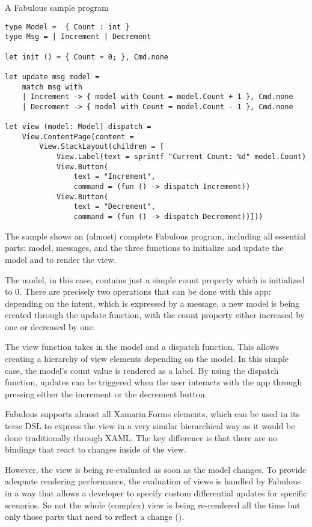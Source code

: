 \begin{listing}[H]
\caption{A Fabulous sample program}
\begin{verbatim}
type Model =  { Count : int }
type Msg = | Increment | Decrement 

let init () = { Count = 0; }, Cmd.none

let update msg model =
    match msg with
    | Increment -> { model with Count = model.Count + 1 }, Cmd.none
    | Decrement -> { model with Count = model.Count - 1 }, Cmd.none

let view (model: Model) dispatch =
    View.ContentPage(content = 
        View.StackLayout(children = [ 
            View.Label(text = sprintf "Current Count: %d" model.Count)
            View.Button(
                text = "Increment", 
                command = (fun () -> dispatch Increment))
            View.Button(
                text = "Decrement", 
                command = (fun () -> dispatch Decrement))]))
\end{verbatim}
\end{listing}

The sample shows an (almost) complete Fabulous program, including all essential parts: model, messages, and the three functions to initialize and update the model and to render the view.

The model, in this case, contains just a simple count property which is initialized to 0. There are precisely two operations that can be done with this app: depending on the intent, which is expressed by a message, a new model is being created through the update function, with the count property either increased by one or decreased by one.

The view function takes in the model and a dispatch function. This allows creating a hierarchy of view elements depending on the model. In this simple case, the model's count value is rendered as a label. By using the dispatch function, updates can be triggered when the user interacts with the app through pressing either the increment or the decrement button.

Fabulous supports almost all Xamarin.Forms elements, which can be used in its terse DSL to express the view in a very similar hierarchical way as it would be done traditionally through XAML. The key difference is that there are no bindings that react to changes inside of the view. 

However, the view is being re-evaluated as soon as the model changes. To provide adequate rendering performance, the evaluation of views is handled by Fabulous in a way that allows a developer to specify custom differential updates for specific scenarios. So not the whole (complex) view is being re-rendered all the time but only those parts that need to reflect a change (\cite{syme_making_2018}).

